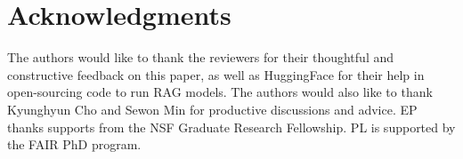 \documentclass{article}
\begin{document}
\section*{Acknowledgments}
The authors would like to thank the reviewers for their thoughtful and constructive feedback on this paper, as well as HuggingFace for their help in open-sourcing code to run RAG models.
The authors would also like to thank Kyunghyun Cho and Sewon Min for productive discussions and advice.
EP thanks supports from the NSF Graduate Research Fellowship. PL is supported by the FAIR PhD program.





\clearpage

\appendix

\end{document}
